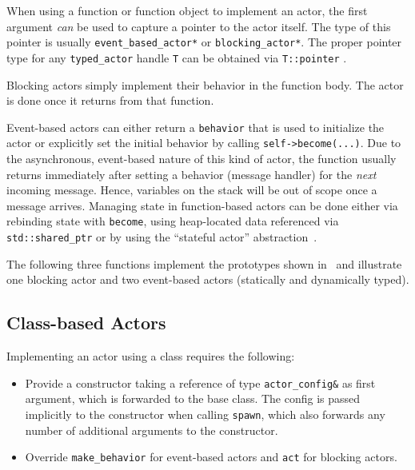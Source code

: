 When using a function or function object to implement an actor, the first argument \emph{can} be used to capture a pointer to the actor itself.
The type of this pointer is usually \lstinline^event_based_actor*^ or \lstinline^blocking_actor*^.
The proper pointer type for any \lstinline^typed_actor^ handle \lstinline^T^ can be obtained via \lstinline^T::pointer^ .

Blocking actors simply implement their behavior in the function body. The actor is done once it returns from that function.

Event-based actors can either return a \lstinline^behavior^  that is used to initialize the actor or explicitly set the initial behavior by calling \lstinline^self->become(...)^. Due to the asynchronous, event-based nature of this kind of actor, the function usually returns immediately after setting a behavior (message handler) for the \emph{next} incoming message. Hence, variables on the stack will be out of scope once a message arrives. Managing state in function-based actors can be done either via rebinding state with \lstinline^become^, using heap-located data referenced via \lstinline^std::shared_ptr^ or by using the ``stateful actor'' abstraction~.

The following three functions implement the prototypes shown in~ and illustrate one blocking actor and two event-based actors (statically and dynamically typed).

\clearpage


\clearpage
\subsection{Class-based Actors}
\label{class-based}

Implementing an actor using a class requires the following:
\begin{itemize}
\item Provide a constructor taking a reference of type \lstinline^actor_config&^ as first argument, which is forwarded to the base class. The config is passed implicitly to the constructor when calling \lstinline^spawn^, which also forwards any number of additional arguments to the constructor.
\item Override \lstinline^make_behavior^ for event-based actors and \lstinline^act^ for blocking actors.
\end{itemize}

